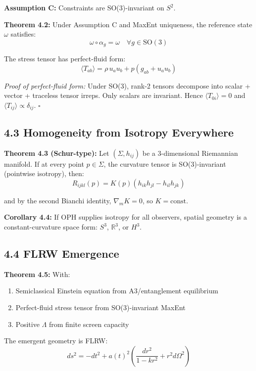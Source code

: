 \textbf{Assumption C:} Constraints are SO(3)-invariant on \(S^2\).

\textbf{Theorem 4.2:} Under Assumption C and MaxEnt uniqueness, the reference state \(\omega\) satisfies: \[\omega \circ \alpha_g = \omega \quad \forall g \in \text{SO}(3)\]

The stress tensor has perfect-fluid form: \[\langle T_{ab} \rangle = \rho \, u_a u_b + p(g_{ab} + u_a u_b)\]

\emph{Proof of perfect-fluid form:} Under SO(3), rank-2 tensors decompose into scalar + vector + traceless tensor irreps. Only scalars are invariant. Hence \(\langle T_{0i} \rangle = 0\) and \(\langle T_{ij} \rangle \propto \delta_{ij}\). \(\square\)

\subsection{4.3 Homogeneity from Isotropy Everywhere}\label{43-homogeneity-from-isotropy-everywhere}

\textbf{Theorem 4.3 (Schur-type):} Let \((\Sigma, h_{ij})\) be a 3-dimensional Riemannian manifold. If at every point \(p \in \Sigma\), the curvature tensor is SO(3)-invariant (pointwise isotropy), then: \[R_{ijkl}(p) = K(p)(h_{ik}h_{jl} - h_{il}h_{jk})\]

and by the second Bianchi identity, \(\nabla_m K = 0\), so \(K = \text{const}\).

\textbf{Corollary 4.4:} If OPH supplies isotropy for all observers, spatial geometry is a constant-curvature space form: \(S^3\), \(\mathbb{R}^3\), or \(H^3\).

\subsection{4.4 FLRW Emergence}\label{44-flrw-emergence}

\textbf{Theorem 4.5:} With:

\begin{enumerate}
\def\labelenumi{\arabic{enumi}.}
\tightlist
\item
  Semiclassical Einstein equation from A3/entanglement equilibrium
\item
  Perfect-fluid stress tensor from SO(3)-invariant MaxEnt
\item
  Positive \(\Lambda\) from finite screen capacity
\end{enumerate}

The emergent geometry is FLRW: \[ds^2 = -dt^2 + a(t)^2 \left(\frac{dr^2}{1-kr^2} + r^2 d\Omega^2\right)\]

